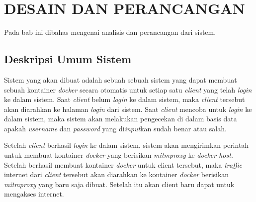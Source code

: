 \chapter{DESAIN DAN PERANCANGAN}
  Pada bab ini dibahas mengenai analisis dan perancangan dari sistem. 
  \section{Deskripsi Umum Sistem}    
    Sistem yang akan dibuat adalah sebuah sebuah sistem yang dapat membuat sebuah kontainer \textit{docker} secara otomatis untuk setiap satu \textit{client} yang telah \textit{login} ke dalam sistem. Saat \textit{client} belum \textit{login} ke dalam sistem, maka \textit{client} tersebut akan diarahkan ke halaman \textit{login} dari sistem. Saat \textit{client} mencoba untuk \textit{login} ke dalam sistem, maka sistem akan melakukan pengecekan di dalam basis data apakah \textit{username} dan \textit{password} yang di\textit{input}kan sudah benar atau salah. 
    
    Setelah \textit{client} berhasil \textit{login} ke dalam sistem, sistem akan mengirimkan perintah untuk membuat kontainer \textit{docker} yang berisikan \textit{mitmproxy} ke \textit{docker host}. Setelah berhasil membuat kontainer \textit{docker} untuk client tersebut, maka \textit{traffic} internet dari \textit{client} tersebut akan diarahkan ke kontainer \textit{docker} berisikan \textit{mitmproxy} yang baru saja dibuat. Setelah itu akan client baru dapat untuk mengakses internet.
  
